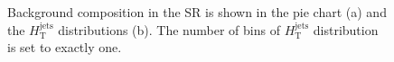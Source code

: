 \begin{figure}[H]
  \centering
  \caption{Background composition in the SR is shown in the pie chart (a) and the $H_{\text{T}}^{\text{jets}}$ distributions (b). The number of bins of $H_{\text{T}}^{\text{jets}}$ distribution is set to exactly one.}
  \label{fig:BkgComposition_SR}
\end{figure}

